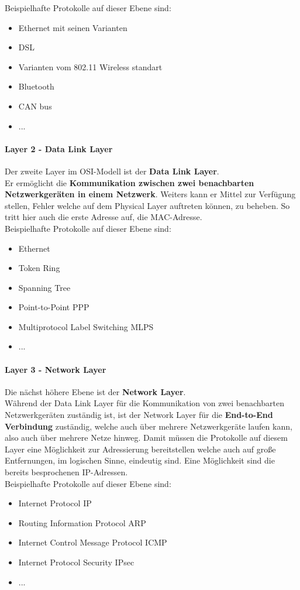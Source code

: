 \documentclass[12pt,a4paper]{report}
\begin{document}
Beispielhafte Protokolle auf dieser Ebene sind:
\begin{itemize}
\item Ethernet mit seinen Varianten
\item DSL 
\item Varianten vom 802.11 Wireless standart
\item Bluetooth
\item CAN bus
\item ...
\end{itemize}
\paragraph{Layer 2 - Data Link Layer}
Der zweite Layer im OSI-Modell ist der \textbf{Data Link Layer}.\\
Er ermöglicht die \textbf{Kommunikation zwischen zwei benachbarten Netzwerkgeräten in einem Netzwerk}. Weiters kann er Mittel zur Verfügung stellen, Fehler welche auf dem Physical Layer auftreten können, zu beheben. So tritt hier auch die erste Adresse auf, die MAC-Adresse.\\

Beispielhafte Protokolle auf dieser Ebene sind:
\begin{itemize}
\item Ethernet
\item Token Ring
\item Spanning Tree 
\item Point-to-Point PPP
\item Multiprotocol Label Switching MLPS
\item ...
\end{itemize}
\paragraph{Layer 3 - Network Layer}
Die nächst höhere Ebene ist der \textbf{Network Layer}.\\
Während der Data Link Layer für die Kommunikation von zwei benachbarten Netzwerkgeräten zuständig ist, ist der Network Layer für die \textbf{End-to-End Verbindung} zuständig, welche auch über mehrere Netzwerkgeräte laufen kann, also auch über mehrere Netze hinweg. Damit müssen die Protokolle auf diesem Layer eine Möglichkeit zur Adressierung bereitstellen welche auch auf große Entfernungen, im logischen Sinne, eindeutig sind. Eine Möglichkeit sind die bereits besprochenen IP-Adressen.\\

Beispielhafte Protokolle auf dieser Ebene sind:
\begin{itemize}
\item Internet Protocol IP
\item Routing Information Protocol ARP
\item Internet Control Message Protocol ICMP
\item Internet Protocol Security IPsec
\item ...
\end{itemize}
\end{document}
